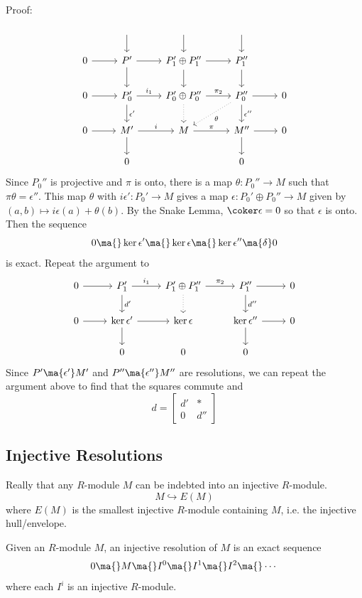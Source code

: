 Proof: 
\[
\begin{tikzcd}
\phantom{x}  & \arrow{d} & \arrow{d} & \arrow{d}  & \\
0 \arrow{r} & P' \arrow{d} \arrow{r} & P_1' \oplus P_1'' \arrow{d} \arrow{r} & P_1'' \arrow{d} & \\
0 \arrow{r} & P_0' \arrow{d}{\epsilon'} \arrow{r}{i_1} & P_0' \oplus P_0'' \arrow[dotted]{d} \arrow{r}{\pi_2} & P_0'' \arrow{r} \arrow{d}{\epsilon''} \arrow[dotted]{dl}{\theta} & 0 \\
0 \arrow{r} & M' \arrow{d} \arrow{r}{i} & M \arrow{r}{\pi} & M'' \arrow{d} \arrow{r}& 0 \\
& 0 & & 0 & 
\end{tikzcd}
\]
Since $P_0''$ is projective and $\pi$ is onto, there is a map $\theta: P_0'' \to M$ such that $\pi \theta= \epsilon''$. This map $\theta$ with $i \epsilon': P_0' \to M$ gives a map $\epsilon: P_0' \oplus P_0'' \to M$ given by $(a,b) \mapsto i \epsilon(a)+\theta(b)$. By the Snake Lemma, $\coker \epsilon=0$ so that $\epsilon$ is onto. 
Then the sequence
\[
0 \ma{} \ker \epsilon' \ma{} \ker \epsilon \ma{} \ker \epsilon'' \ma{\delta} 0 
\]
is exact. Repeat the argument to 
\[
\begin{tikzcd}
0 \arrow{r} & P_1' \arrow{r}{i_1} \arrow{d}{d'} & P_1' \oplus P_1'' \arrow[dotted]{d} \arrow{r}{\pi_2} & P_1'' \arrow{r} \arrow{d}{d''} & 0 \\
0 \arrow{r} & \ker \epsilon' \arrow{d} \arrow{r} & \ker \epsilon & \ker \epsilon'' \arrow{r} \arrow{d} & 0 \\
& 0 & 0 & 0 & 
\end{tikzcd}
\]
Since $P' \ma{\epsilon'} M'$ and $P'' \ma{\epsilon''} M''$ are resolutions, we can repeat the argument above to find that the squares commute and
\[
d= \begin{bmatrix} d' & * \\ 0 & d'' \end{bmatrix} 
\]

\subsection{Injective Resolutions} 

Really that any $R$-module $M$ can be indebted into an injective $R$-module. 
\[
M \hookrightarrow E(M)
\]
where $E(M)$ is the smallest injective $R$-module containing $M$, i.e. the injective hull/envelope. 

\begin{dfn}
Given an $R$-module $M$, an injective resolution of $M$ is an exact sequence
\[
0 \ma{} M \ma{} I^0 \ma{} I^1 \ma{} I^2 \ma{} \cdots
\]
where each $I^i$ is an injective $R$-module. 
\end{dfn}

